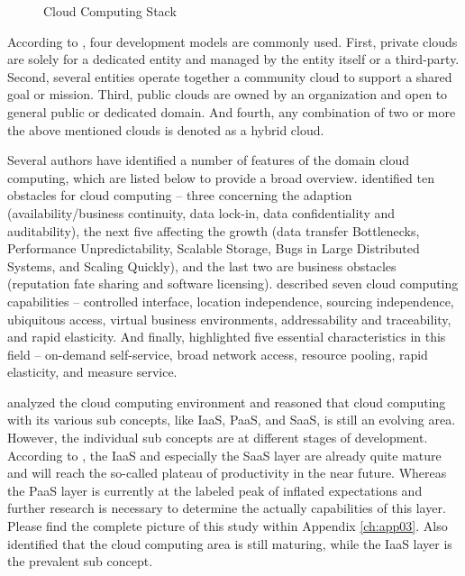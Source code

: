 \begin{figure}[htb]
	\centering
	
	\caption{Cloud Computing Stack}
	\label{fig:ccs}
\end{figure}

According to \citet[p. 3]{Mell2011}, four development models are commonly used. First, private clouds are solely for a dedicated entity and managed by the entity itself or a third-party. Second, several entities operate together a community cloud to support a shared goal or mission. Third, public clouds are owned by an organization and open to general public or dedicated domain. And fourth, any combination of two or more the above mentioned clouds is denoted as a hybrid cloud.

Several authors have identified a number of features of the domain cloud computing, which are listed below to provide a broad overview. \citet[pp. 54-58]{Armbrust2010} identified ten obstacles for cloud computing -- three concerning the adaption (availability/business continuity, data lock-in, data confidentiality and auditability), the next five affecting the growth (data transfer Bottlenecks, Performance Unpredictability, Scalable Storage, Bugs in Large Distributed Systems, and Scaling Quickly), and the last two are business obstacles (reputation fate sharing and software licensing). \citet[pp. 120-127]{Iyer2010} described seven cloud computing capabilities -- controlled interface, location independence, sourcing independence, ubiquitous access, virtual business environments, addressability and traceability, and rapid elasticity. And finally, \citet[p. 2]{Mell2011} highlighted five essential characteristics in this field -- on-demand self-service, broad network access, resource pooling, rapid elasticity, and measure service. 

\citet{Smith2012} analyzed the cloud computing environment and reasoned that cloud computing with its various sub concepts, like \ac{IaaS}, \ac{PaaS}, and \ac{SaaS}, is still an evolving area. However, the individual sub concepts are at different stages of development. According to \citet[p. 5]{Smith2012}, the \ac{IaaS} and especially the \ac{SaaS} layer are already quite mature and will reach the so-called plateau of productivity in the near future. Whereas the \ac{PaaS} layer is currently at the labeled peak of inflated expectations and further research is necessary to determine the actually capabilities of this layer. Please find the complete picture of this study within Appendix \ref{ch:app03}. Also \citet[p. 120]{Iyer2010} identified that the cloud computing area is still maturing, while the \ac{IaaS} layer is the prevalent sub concept.

